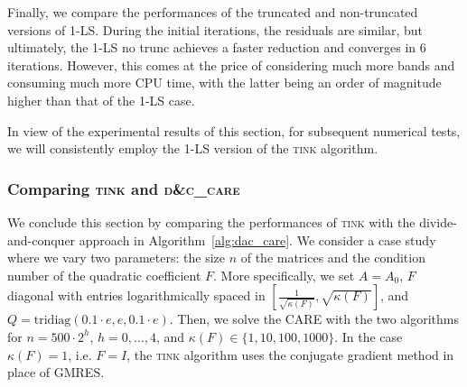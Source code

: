 \documentclass[a4paper,10pt]{article}
\newcommand{\upd}[1]{{\color{black}#1}} %
\begin{document}
Finally, we compare the performances of the truncated and non-truncated versions of 1-LS. During the initial iterations, the residuals are similar, but ultimately, the 1-LS no trunc achieves a faster reduction and converges in 6 iterations. However, this comes at the price of considering much more bands and consuming much more CPU \upd{time}, with the latter being an order of magnitude higher than that of the 1-LS case.

In view of the experimental results of this section, for subsequent numerical tests, we will consistently employ the 1-LS version of the \textsc{tink} algorithm.

\subsubsection{Comparing \textsc{tink} and \textsc{d\&c\_care}}
\label{sec:numer_compar}
We conclude this section by comparing the performances of \textsc{tink} with the divide-and-conquer approach in Algorithm~\ref{alg:dac_care}. We consider a case study where we vary two parameters: the size $n$ of the matrices and the condition number of the quadratic coefficient $F$. More specifically, we set $A=A_0$, $F$ diagonal with entries logarithmically spaced in $\left[\frac{1}{\sqrt{\kappa(F)}}, \sqrt{\kappa(F)}\right]$, and $Q=\mathrm{tridiag}(0.1\cdot e, e, 0.1\cdot e)$. Then, we solve the CARE with the two algorithms for $n= 500\cdot 2^h$, $h=0,\dots, 4$, and $\kappa(F)\in\{1, 10, 100, 1000\}$. In the case $\kappa(F)=1$, i.e. $F=I$, the \textsc{tink} algorithm uses the conjugate gradient method in place of GMRES.
\end{document}

